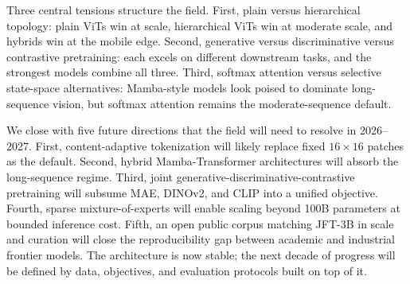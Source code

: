 \documentclass{article}
\begin{document}
Three central tensions structure the field. First, plain versus hierarchical topology: plain ViTs win at scale, hierarchical ViTs win at moderate scale, and hybrids win at the mobile edge. Second, generative versus discriminative versus contrastive pretraining: each excels on different downstream tasks, and the strongest models combine all three. Third, softmax attention versus selective state-space alternatives: Mamba-style models look poised to dominate long-sequence vision, but softmax attention remains the moderate-sequence default.

We close with five future directions that the field will need to resolve in 2026--2027. First, content-adaptive tokenization will likely replace fixed \(16 \times 16\) patches as the default. Second, hybrid Mamba-Transformer architectures will absorb the long-sequence regime. Third, joint generative-discriminative-contrastive pretraining will subsume MAE, DINOv2, and CLIP into a unified objective. Fourth, sparse mixture-of-experts will enable scaling beyond 100B parameters at bounded inference cost. Fifth, an open public corpus matching JFT-3B in scale and curation will close the reproducibility gap between academic and industrial frontier models. The architecture is now stable; the next decade of progress will be defined by data, objectives, and evaluation protocols built on top of it.



\end{document}
